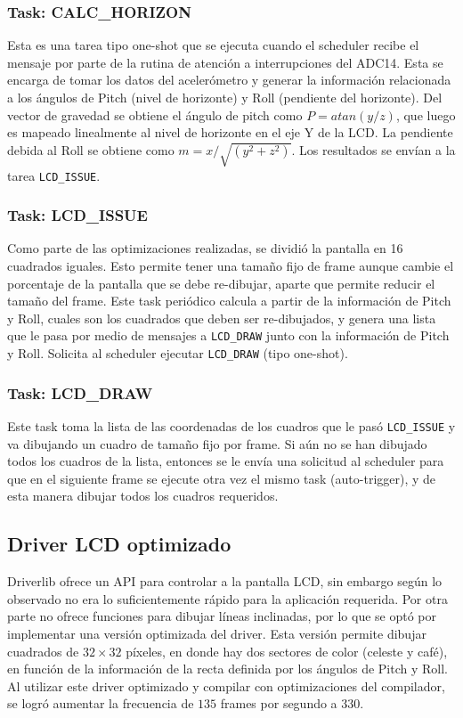 \subsubsection{Task: CALC\_HORIZON}
\label{sec:calc_horizon}
Esta es una tarea tipo one-shot que se ejecuta cuando el scheduler recibe el
mensaje por parte de la rutina de atención a interrupciones del ADC14. Esta se
encarga de tomar los datos del acelerómetro y generar la información relacionada
a los ángulos de Pitch (nivel de horizonte) y Roll (pendiente del horizonte).
Del vector de gravedad se obtiene el ángulo de pitch como $P = atan(y/z)$, que
luego es mapeado linealmente al nivel de horizonte en el eje Y de la LCD. La
pendiente debida al Roll se obtiene como $m = x/\sqrt{(y^2+z^2)}$. Los
resultados se envían a la tarea \texttt{LCD\_ISSUE}.

\subsubsection{Task: LCD\_ISSUE}
\label{sec:lcd_issue}

Como parte de las optimizaciones realizadas, se dividió la pantalla en 16
cuadrados iguales. Esto permite tener una tamaño fijo de frame aunque cambie el
porcentaje de la pantalla que se debe re-dibujar, aparte que permite reducir el
tamaño del frame. Este task periódico calcula a partir de la información de
Pitch y Roll, cuales son los cuadrados que deben ser re-dibujados, y genera una
lista que le pasa por medio de mensajes a \texttt{LCD\_DRAW} junto con la
información de Pitch y Roll. Solicita al scheduler ejecutar \texttt{LCD\_DRAW}
(tipo one-shot).

\subsubsection{Task: LCD\_DRAW}
\label{sec:lcd_draw}
Este task toma la lista de las coordenadas de los cuadros que le pasó
\texttt{LCD\_ISSUE} y va dibujando un cuadro de tamaño fijo por frame. Si aún no
se han dibujado todos los cuadros de la lista, entonces se le envía una
solicitud al scheduler para que en el siguiente frame se ejecute otra vez el
mismo task (auto-trigger), y de esta manera dibujar todos los cuadros
requeridos.

\subsection{Driver LCD optimizado}
Driverlib ofrece un API para controlar a la pantalla LCD, sin embargo según lo
observado no era lo suficientemente rápido para la aplicación requerida. Por
otra parte no ofrece funciones para dibujar líneas inclinadas, por lo que se
optó por implementar una versión optimizada del driver. Esta versión permite
dibujar cuadrados de $32\times 32$ píxeles, en donde hay dos sectores de color
(celeste y café), en función de la información de la recta definida por los
ángulos de Pitch y Roll. Al utilizar este driver optimizado y compilar con
optimizaciones del compilador, se logró aumentar la frecuencia de $135$ frames
por segundo a $330$.


